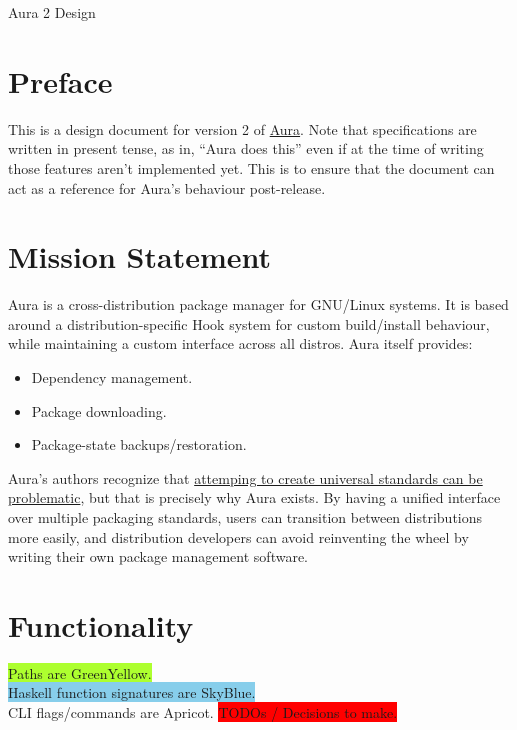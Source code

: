 \documentclass{article}
\begin{document}

\tableofcontents
\clearpage

Aura 2 Design

\section{Preface}\label{preface}

This is a design document for version 2 of
\href{https://github.com/fosskers/aura}{Aura}. Note that specifications
are written in present tense, as in, ``Aura does this'' even if at the
time of writing those features aren't implemented yet. This is to ensure
that the document can act as a reference for Aura's behaviour
post-release.

\section{Mission Statement}\label{mission-statement}

Aura is a cross-distribution package manager for GNU/Linux systems. It
is based around a distribution-specific Hook system for custom
build/install behaviour, while maintaining a custom interface across all
distros. Aura itself provides:

\begin{itemize}
\itemsep1pt\parskip0pt
\item
  Dependency management.
\item
  Package downloading.
\item
  Package-state backups/restoration.
\end{itemize}

Aura's authors recognize that \href{http://www.xkcd.com/927/}{attemping
to create universal standards can be problematic}, but that is precisely
why Aura exists. By having a unified interface over multiple packaging
standards, users can transition between distributions more easily, and
distribution developers can avoid reinventing the wheel by writing their
own package management software.

\section{Functionality}
\colorbox{GreenYellow}{Paths are GreenYellow.}\\
\colorbox{SkyBlue}{Haskell function signatures are SkyBlue.}\\
\colorbox{Apricot}{CLI flags/commands are Apricot.}
\colorbox{Red}{TODOs / Decisions to make.}
\end{document}
